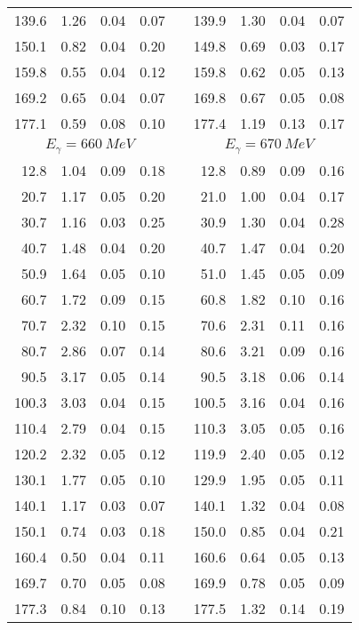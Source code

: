 \begin{table}[htbp]
\begin{center}
\begin{tabular}{|r|r|c|c|l|r|r|c|c|}
139.6 &  1.26 &  0.04 &  0.07 & & 139.9 &  1.30 &  0.04 &  0.07 \\ 
150.1 &  0.82 &  0.04 &  0.20 & & 149.8 &  0.69 &  0.03 &  0.17 \\ 
159.8 &  0.55 &  0.04 &  0.12 & & 159.8 &  0.62 &  0.05 &  0.13 \\ 
169.2 &  0.65 &  0.04 &  0.07 & & 169.8 &  0.67 &  0.05 &  0.08 \\ 
177.1 &  0.59 &  0.08 &  0.10 & & 177.4 &  1.19 &  0.13 &  0.17 \\ 
\hline 
\hline 
\multicolumn{4}{|c|}{ $E_{\gamma}=660~MeV$} & & 
\multicolumn{4}{c|}{ $E_{\gamma}=670~MeV$} \\ 
\cline{1-4} 
\cline{6-9} 
 12.8 &  1.04 &  0.09 &  0.18 & &  12.8 &  0.89 &  0.09 &  0.16 \\ 
 20.7 &  1.17 &  0.05 &  0.20 & &  21.0 &  1.00 &  0.04 &  0.17 \\ 
 30.7 &  1.16 &  0.03 &  0.25 & &  30.9 &  1.30 &  0.04 &  0.28 \\ 
 40.7 &  1.48 &  0.04 &  0.20 & &  40.7 &  1.47 &  0.04 &  0.20 \\ 
 50.9 &  1.64 &  0.05 &  0.10 & &  51.0 &  1.45 &  0.05 &  0.09 \\ 
 60.7 &  1.72 &  0.09 &  0.15 & &  60.8 &  1.82 &  0.10 &  0.16 \\ 
 70.7 &  2.32 &  0.10 &  0.15 & &  70.6 &  2.31 &  0.11 &  0.16 \\ 
 80.7 &  2.86 &  0.07 &  0.14 & &  80.6 &  3.21 &  0.09 &  0.16 \\ 
 90.5 &  3.17 &  0.05 &  0.14 & &  90.5 &  3.18 &  0.06 &  0.14 \\ 
100.3 &  3.03 &  0.04 &  0.15 & & 100.5 &  3.16 &  0.04 &  0.16 \\ 
110.4 &  2.79 &  0.04 &  0.15 & & 110.3 &  3.05 &  0.05 &  0.16 \\ 
120.2 &  2.32 &  0.05 &  0.12 & & 119.9 &  2.40 &  0.05 &  0.12 \\ 
130.1 &  1.77 &  0.05 &  0.10 & & 129.9 &  1.95 &  0.05 &  0.11 \\ 
140.1 &  1.17 &  0.03 &  0.07 & & 140.1 &  1.32 &  0.04 &  0.08 \\ 
150.1 &  0.74 &  0.03 &  0.18 & & 150.0 &  0.85 &  0.04 &  0.21 \\ 
160.4 &  0.50 &  0.04 &  0.11 & & 160.6 &  0.64 &  0.05 &  0.13 \\ 
169.7 &  0.70 &  0.05 &  0.08 & & 169.9 &  0.78 &  0.05 &  0.09 \\ 
177.3 &  0.84 &  0.10 &  0.13 & & 177.5 &  1.32 &  0.14 &  0.19 \\ 
\cline{1-4} 
\cline{6-9} 
\end{tabular} 

\end{center} 
\end{table}
